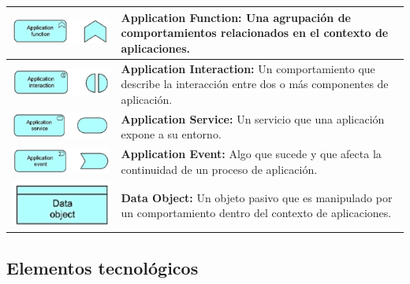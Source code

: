 \begin{longtable}{|c|p{8cm}|}
\hline
\includegraphics{apendices/ARCHI/application/function.png} & 
\textbf{Application Function:} Una agrupación de comportamientos relacionados en el contexto de aplicaciones. \\
\hline
\includegraphics{apendices/ARCHI/application/interaction.png} & 
\textbf{Application Interaction:} Un comportamiento que describe la interacción entre dos o más componentes de aplicación. \\
\hline
\includegraphics{apendices/ARCHI/application/service.png} & 
\textbf{Application Service:} Un servicio que una aplicación expone a su entorno. \\
\hline
\includegraphics{apendices/ARCHI/application/event.png} & 
\textbf{Application Event:} Algo que sucede y que afecta la continuidad de un proceso de aplicación. \\
\hline
\includegraphics{apendices/ARCHI/application/object.png} & 
\textbf{Data Object:} Un objeto pasivo que es manipulado por un comportamiento dentro del contexto de aplicaciones. \\
\hline
\end{longtable}

\subsection{Elementos tecnológicos}

